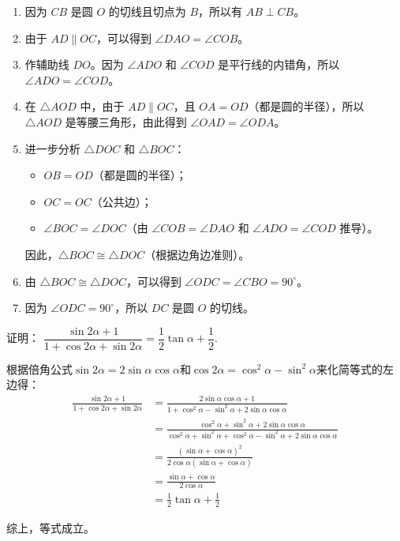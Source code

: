 \documentclass[answers]{exam}
\begin{document}
\begin{questions}
	\begin{solution}
		\begin{enumerate}[label=\arabic*.]
			\item 因为 $CB$ 是圆 $O$ 的切线且切点为 $B$，所以有 $AB \perp CB$。
			\item 由于 $AD \parallel OC$，可以得到 $\angle DAO = \angle COB$。
			\item 作辅助线 $DO$。因为 $\angle ADO$ 和 $\angle COD$ 是平行线的内错角，所以 $\angle ADO = \angle COD$。
			\item 在 $\triangle AOD$ 中，由于 $AD \parallel OC$，且 $OA = OD$（都是圆的半径），所以 $\triangle AOD$ 是等腰三角形，由此得到 $\angle OAD = \angle ODA$。
			\item 进一步分析 $\triangle DOC$ 和 $\triangle BOC$：
			      \begin{itemize}
				      \item $OB = OD$（都是圆的半径）；
				      \item $OC = OC$（公共边）；
				      \item $\angle BOC = \angle DOC$（由 $\angle COB = \angle DAO$ 和 $\angle ADO = \angle COD$ 推导）。
			      \end{itemize}
			      因此，$\triangle BOC \cong \triangle DOC$（根据边角边准则）。
			\item 由 $\triangle BOC \cong \triangle DOC$，可以得到 $\angle ODC = \angle CBO = 90^\circ$。
			\item 因为 $\angle ODC = 90^\circ$，所以 $DC$ 是圆 $O$ 的切线。
		\end{enumerate}
	\end{solution}

	\question 证明： $\dfrac{\sin2\alpha + 1}{1+\cos2\alpha + \sin2\alpha} = \dfrac12\tan\alpha + \dfrac12$.
	\begin{mathenum}
		\item 根据倍角公式$\sin2\alpha = 2\sin\alpha\cos\alpha$和$\cos2\alpha=\cos^2\alpha -
			\sin^2\alpha$来化简等式的左边得：
		\begin{align*}
			\frac{\sin2\alpha + 1}{1+\cos2\alpha + \sin2\alpha}
			 & = \frac{2\sin\alpha\cos\alpha + 1}{1 + \cos^2\alpha - \sin^2\alpha + 2\sin\alpha\cos\alpha} \\
			 & = \frac{\cos^2\alpha + \sin^2\alpha + 2\sin\alpha\cos\alpha}{\cos^2\alpha + \sin^2\alpha +
			\cos^2\alpha - \sin^2\alpha + 2\sin\alpha\cos\alpha}                                           \\
			 & = \frac{(\sin\alpha + \cos\alpha)^2}{2\cos\alpha(\sin\alpha + \cos\alpha)}                  \\
			 & = \frac{\sin\alpha + \cos\alpha}{2\cos\alpha}                                               \\
			 & = \frac12\tan\alpha + \frac12
		\end{align*}
	\item 综上，等式成立。
	\end{mathenum}

\end{questions}
\end{document}

